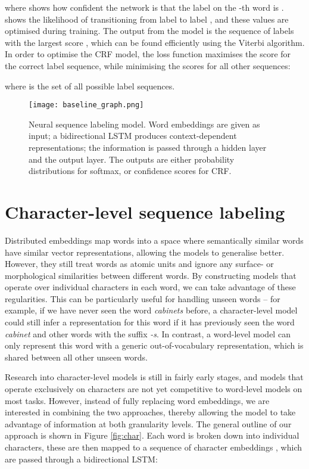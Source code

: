\documentclass[11pt]{article}
\begin{document}
\noindent where  shows how confident the network is that the label on the -th word is .  shows the likelihood of transitioning from label  to label , and these values are optimised during training. The output from the model is the sequence of labels with the largest score , which can be found efficiently using the Viterbi algorithm. In order to optimise the CRF model, the loss function maximises the score for the correct label sequence, while minimising the scores for all other sequences:



\noindent where  is the set of all possible label sequences. 



\begin{figure}[t]
    \centering
	\texttt{[image: baseline\_graph.png]}
	\caption{Neural sequence labeling model. Word embeddings are given as input; a bidirectional LSTM produces context-dependent representations; the information is passed through a hidden layer and the output layer. The outputs are either probability distributions for softmax, or confidence scores for CRF. }
	\label{fig:baseline}
\end{figure}



\section{Character-level sequence labeling}
\label{sec:concat}

Distributed embeddings map words into a space where semantically similar words have similar vector representations, allowing the models to generalise better.
However, they still treat words as atomic units and ignore any surface- or morphological similarities between different words. By constructing models that operate over individual characters in each word, we can take advantage of these regularities. This can be particularly useful for handling unseen words -- for example, if we have never seen the word \textit{cabinets} before, a character-level model could still infer a representation for this word if it has previously seen the word \textit{cabinet} and other words with the suffix \textit{-s}. In contrast, a word-level model can only represent this word with a generic out-of-vocabulary representation, which is shared between all other unseen words.

Research into character-level models is still in fairly early stages, and models that operate exclusively on characters are not yet competitive to word-level models on most tasks. However, instead of fully replacing word embeddings, we are interested in combining the two approaches, thereby allowing the model to take advantage of information at both granularity levels.
The general outline of our approach is shown in Figure \ref{fig:char}. Each word is broken down into individual characters, these are then mapped to a sequence of character embeddings , which are passed through a bidirectional LSTM:
\end{document}
